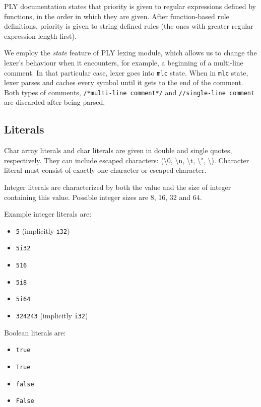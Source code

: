 \documentclass[times, utf8, diplomski]{fer}
\theoremstyle{definition}
\begin{document}
PLY documentation states that priority is given to regular expressions defined by functions, 
in the order in which they are given.
After function-based rule definitions, 
priority is given to string defined rules (the ones with greater regular expression length first).

We employ the \textit{state} feature of PLY lexing module, 
which allows us to change the lexer's behaviour
when it encounters, for example, a beginning of a multi-line comment. 
In that particular case, lexer goes into \texttt{mlc} state.
When in \texttt{mlc} state, lexer parses and caches every 
symbol until it gets to the end of the comment. 
Both types of comments, \texttt{/*multi-line comment*/} and \texttt{//single-line comment} are discarded
after being parsed.

\subsection{Literals}

Char array literals and char literals are given in double and single quotes, respectively.
They can include escaped characters:  (\textbackslash 0, \textbackslash n, \textbackslash t, 
\textbackslash ", \textbackslash \textquotesingle). 
Character literal must consist of exactly one character or escaped character.

Integer literals are characterized by both the value and the size of integer containing this value.
Possible integer sizes are 8, 16, 32 and 64.

Example integer literals are:
\begin{itemize}
    \item \texttt{5} (implicitly \texttt{i32})
    \item \texttt{5i32}
    \item \texttt{516}
    \item \texttt{5i8}
    \item \texttt{5i64}
    \item \texttt{324243} (implicitly \texttt{i32})
\end{itemize}

Boolean literals are:

\begin{itemize}
    \item \texttt{true}
    \item \texttt{True}
    \item \texttt{false}
    \item \texttt{False}
\end{itemize}
\end{document}
